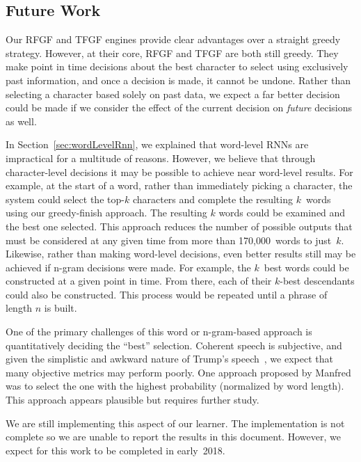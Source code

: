 \documentclass{article}
\begin{document}
\subsection{Future Work}

Our RFGF and TFGF engines provide clear advantages over a straight greedy strategy.  However, at their core, RFGF and TFGF are both still greedy.  They make point in time decisions about the best character to select using exclusively past information, and once a decision is made, it cannot be undone.  Rather than selecting a character based solely on past data, we expect a far better decision could be made if we consider the effect of the current decision on \textit{future} decisions as well.

In Section~\ref{sec:wordLevelRnn}, we explained that word-level RNNs are impractical for a multitude of reasons. However, we believe that through character-level decisions it may be possible to achieve near word-level results.  For example, at the start of a word, rather than immediately picking a character, the system could select the top-$k$ characters and complete the resulting $k$~words using our greedy-finish approach.  The resulting $k$ words could be examined and the best one selected.  This approach reduces the number of possible outputs that must be considered at any given time from more than 170,000~words to just~$k$.  Likewise, rather than making word-level decisions, even better results still may be achieved if n-gram decisions were made.  For example, the $k$~best words could be constructed at a given point in time.  From there, each of their $k$-best descendants could also be constructed.  This process would be repeated until a phrase of length $n$ is built.  

One of the primary challenges of this word or n-gram-based approach is quantitatively deciding the ``best'' selection.  Coherent speech is subjective, and given the simplistic and awkward nature of Trump's speech~\cite{goldhill2017}, we expect that many objective metrics may perform poorly. One approach proposed by Manfred was to select the one with the highest probability (normalized by word length). This approach appears plausible but requires further study.

We are still implementing this aspect of our learner.  The implementation is not complete so we are unable to report the results in this document.  However, we expect for this work to be completed in early~2018.



\end{document}
